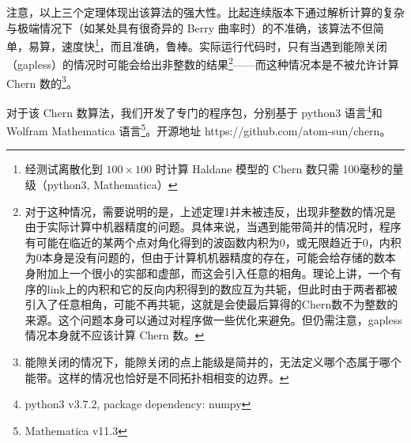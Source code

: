 注意，以上三个定理体现出该算法的强大性。比起连续版本下通过解析计算的复杂与极端情况下（如某处具有很奇异的 Berry 曲率时）的不准确，该算法不但简单，易算，速度快\footnote{经测试离散化到 $100\times100$ 时计算 Haldane 模型的 Chern 数只需 100毫秒的量级（python3, Mathematica）}，而且准确，鲁棒。实际运行代码时，只有当遇到能隙关闭（gapless）的情况时可能会给出非整数的结果\footnote{对于这种情况，需要说明的是，上述定理1并未被违反，出现非整数的情况是由于实际计算中机器精度的问题。具体来说，当遇到能带简并的情况时，程序有可能在临近的某两个点对角化得到的波函数内积为0，或无限趋近于0，内积为0本身是没有问题的，但由于计算机机器精度的存在，可能会给存储的数本身附加上一个很小的实部和虚部，而这会引入任意的相角。理论上讲，一个有序的link上的内积和它的反向内积得到的数应互为共轭，但此时由于两者都被引入了任意相角，可能不再共轭，这就是会使最后算得的Chern数不为整数的来源。这个问题本身可以通过对程序做一些优化来避免。但仍需注意，gapless 情况本身就不应该计算 Chern 数。}——而这种情况本是不被允许计算 Chern 数的\footnote{能隙关闭的情况下，能隙关闭的点上能级是简并的，无法定义哪个态属于哪个能带\cite{topobook}。这样的情况也恰好是不同拓扑相相变的边界。}。


对于该 Chern 数算法，我们开发了专门的程序包，分别基于 python3 语言\footnote{python3 v3.7.2, package dependency: numpy}和 Wolfram Mathematica 语言\footnote{Mathematica v11.3}。开源地址\cite{repo-chern} https://github.com/atom-sun/chern。
